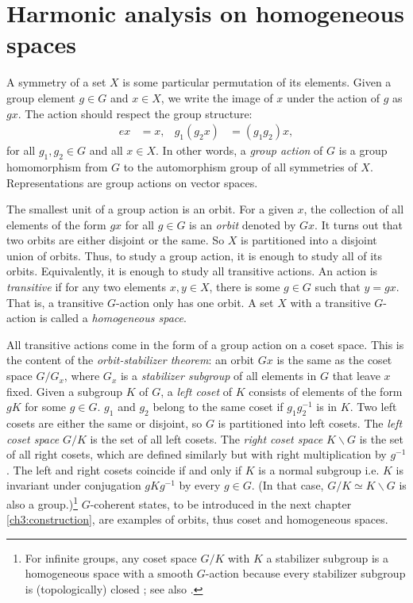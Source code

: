 \section{Harmonic analysis on homogeneous spaces}\label{ch2:harmonic-analysis}

A symmetry of a set $X$ is some particular permutation of its elements. Given a group element $g \in G$ and $x \in X$, we write the image of $x$ under the action of $g$ as $gx$. The action should respect the group structure:
\begin{align}
	ex &= x, & g_1 (g_2 x) &= (g_1 g_2)x,
\end{align}
for all $g_1,g_2 \in G$ and all $x \in X$. In other words, a \emph{group action} of $G$ is a group homomorphism from $G$ to the automorphism group of all symmetries of $X$. Representations are group actions on vector spaces. 

The smallest unit of a group action is an orbit. For a given $x$, the collection of all elements of the form $gx$ for all $g\in G$ is an \emph{orbit} denoted by $Gx$. It turns out that two orbits are either disjoint or the same. So $X$ is partitioned into a disjoint union of orbits. Thus, to study a group action, it is enough to study all of its orbits. Equivalently, it is enough to study all transitive actions. An action is \emph{transitive} if for any two elements $x,y \in X$, there is some $g \in G$ such that $y = gx$. That is, a transitive $G$-action only has one orbit. A set $X$ with a transitive $G$-action is called a \emph{homogeneous space}. 

All transitive actions come in the form of a group action on a coset space. This is the content of the \emph{orbit-stabilizer theorem}: an orbit $Gx$ is the same as the coset space $G/G_x$, where $G_x$ is a \emph{stabilizer subgroup} of all elements in $G$ that leave $x$ fixed. Given a subgroup $K$ of $G$, a \emph{left coset} of $K$ consists of elements of the form $gK$ for some $g \in G$.  $g_1$ and $g_2$ belong to the same coset if $g_1 g_2^{-1}$ is in $K$. Two left cosets are either the same or disjoint, so $G$ is partitioned into left cosets. The \emph{left coset space} $G/K$ is the set of all left cosets. The \emph{right coset space} $K\backslash G$ is the set of all right cosets, which are defined similarly but with right multiplication by $g^{-1}$. The left and right cosets coincide if and only if $K$ is a normal subgroup i.e. $K$ is invariant under conjugation $gKg^{-1}$ by every $g \in G$. (In that case, $G/K \simeq K\backslash G$ is also a group.)\footnote{For infinite groups, any coset space $G/K$ with $K$ a stabilizer subgroup is a homogeneous space with a smooth $G$-action because every stabilizer subgroup is (topologically) closed \cite[Theorem 3.26, p.36]{Kirillov}; see also \cite{Berndt}.} 
$G$-coherent states, to be introduced in the next chapter \autoref{ch3:construction}, are examples of orbits, thus coset and homogeneous spaces.

